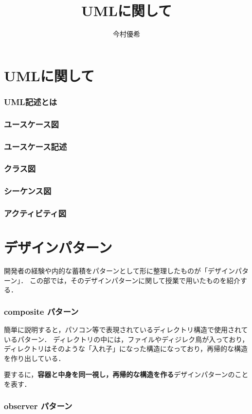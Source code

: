 \documentclass[documentclass]{jsarticle}
\begin{document}
\title{UMLに関して}
\author{今村優希}
\maketitle


\newpage

\part{UMLに関して}
\section{UML記述とは}

\section{ユースケース図}

\section{ユースケース記述}

\section{クラス図}

\section{シーケンス図}

\section{アクティビティ図}

\newpage

\part{デザインパターン}
開発者の経験や内的な蓄積をパターンとして形に整理したものが「デザインパターン」．
この部では，そのデザインパターンに関して授業で用いたものを紹介する．

\newpage
\section{composite パターン}
簡単に説明すると，パソコン等で表現されているディレクトリ構造で使用されているパターン．
ディレクトリの中には，ファイルやディジレク鳥が入っており，ディレクトリはそのような「入れ子」になった構造になっており，再帰的な構造を作り出している．

要するに，\textbf{容器と中身を同一視し，再帰的な構造を作る}デザインパターンのことを表す．

\section{observer パターン}
\end{document}
